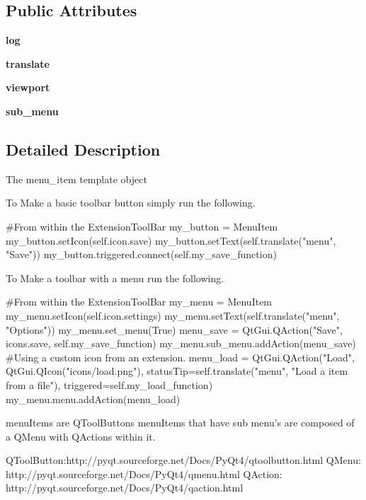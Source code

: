 \subsection*{Public Attributes}
\begin{DoxyCompactItemize}
\item 
\hypertarget{classcommotion__client_1_1GUI_1_1extension__toolbar_1_1MenuItem_a6984ce2f476f256d285f1517d9beead6}{{\bfseries log}}\label{classcommotion__client_1_1GUI_1_1extension__toolbar_1_1MenuItem_a6984ce2f476f256d285f1517d9beead6}

\item 
\hypertarget{classcommotion__client_1_1GUI_1_1extension__toolbar_1_1MenuItem_a0134e71e4901cc4eec9b50785cba7265}{{\bfseries translate}}\label{classcommotion__client_1_1GUI_1_1extension__toolbar_1_1MenuItem_a0134e71e4901cc4eec9b50785cba7265}

\item 
\hypertarget{classcommotion__client_1_1GUI_1_1extension__toolbar_1_1MenuItem_a49032d0bb2b22e07d66a228d756d9350}{{\bfseries viewport}}\label{classcommotion__client_1_1GUI_1_1extension__toolbar_1_1MenuItem_a49032d0bb2b22e07d66a228d756d9350}

\item 
\hypertarget{classcommotion__client_1_1GUI_1_1extension__toolbar_1_1MenuItem_a6bc93d5526252a71a9543f75df2aeac6}{{\bfseries sub\+\_\+menu}}\label{classcommotion__client_1_1GUI_1_1extension__toolbar_1_1MenuItem_a6bc93d5526252a71a9543f75df2aeac6}

\end{DoxyCompactItemize}


\subsection{Detailed Description}
\begin{DoxyVerb}The menu_item template object

To Make a basic toolbar button simply run the following.

#From within the ExtensionToolBar
my_button = MenuItem
my_button.setIcon(self.icon.save)
my_button.setText(self.translate("menu", "Save"))
my_button.triggered.connect(self.my_save_function)

To Make a toolbar with a menu run the following.

#From within the ExtensionToolBar
my_menu = MenuItem
my_menu.setIcon(self.icon.settings)
my_menu.setText(self.translate("menu", "Options"))
my_menu.set_menu(True)
menu_save = QtGui.QAction("Save", icons.save, self.my_save_function)
my_menu.sub_menu.addAction(menu_save)
#Using a custom icon from an extension.
menu_load = QtGui.QAction("Load", QtGui.QIcon("icons/load.png"), statusTip=self.translate("menu", "Load a item from a file"), triggered=self.my_load_function)
my_menu.menu.addAction(menu_load)

menuItems are QToolButtons
menuItems that have sub menu's are composed of a QMenu with QActions within it.

QToolButton:http://pyqt.sourceforge.net/Docs/PyQt4/qtoolbutton.html
QMenu: http://pyqt.sourceforge.net/Docs/PyQt4/qmenu.html
QAction: http://pyqt.sourceforge.net/Docs/PyQt4/qaction.html\end{DoxyVerb}
 

